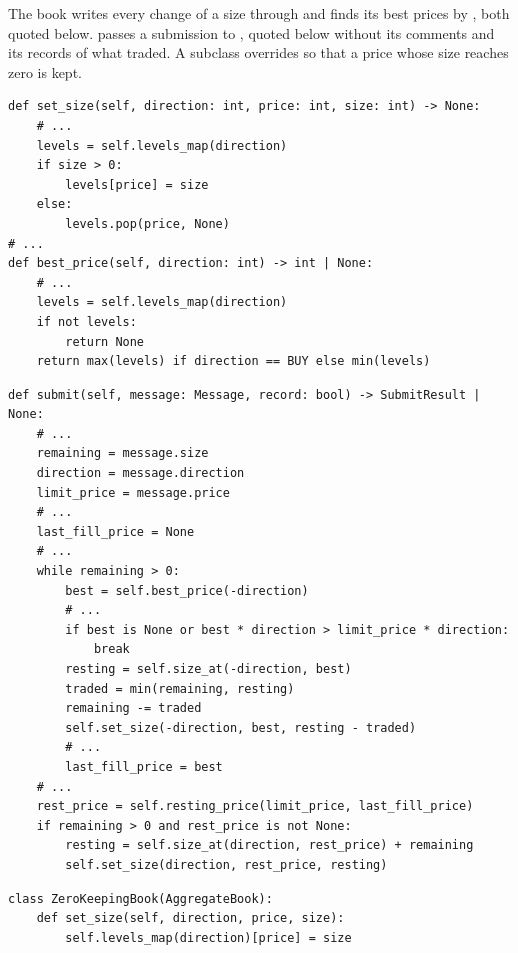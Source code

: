 \begin{question}
\label{question.setSizeKeepingEmptyLevelsNeverReturns}
The book writes every change of a size through 
and finds its best prices by , both quoted below.
 passes a submission to ,
quoted below without its comments and its records of what traded.
A subclass overrides  so that a price whose size reaches zero is kept.
\begin{lstlisting}[caption={\protect\codehl{unito26.lob.orderbook.AggregateBook}: a write, and the best price. Docstrings elided.}, label=listing.setSizeKeepingEmptyLevelsStorage]
def set_size(self, direction: int, price: int, size: int) -> None:
    # ...
    levels = self.levels_map(direction)
    if size > 0:
        levels[price] = size
    else:
        levels.pop(price, None)
# ...
def best_price(self, direction: int) -> int | None:
    # ...
    levels = self.levels_map(direction)
    if not levels:
        return None
    return max(levels) if direction == BUY else min(levels)
\end{lstlisting}
\begin{lstlisting}[caption={\protect\codehl{unito26.lob.orderbook.AggregateBook.submit}, abridged: its comments, and its records of what traded, are cut.}, label=listing.setSizeKeepingEmptyLevelsSubmit]
def submit(self, message: Message, record: bool) -> SubmitResult | None:
    # ...
    remaining = message.size
    direction = message.direction
    limit_price = message.price
    # ...
    last_fill_price = None
    # ...
    while remaining > 0:
        best = self.best_price(-direction)
        # ...
        if best is None or best * direction > limit_price * direction:
            break
        resting = self.size_at(-direction, best)
        traded = min(remaining, resting)
        remaining -= traded
        self.set_size(-direction, best, resting - traded)
        # ...
        last_fill_price = best
    # ...
    rest_price = self.resting_price(limit_price, last_fill_price)
    if remaining > 0 and rest_price is not None:
        resting = self.size_at(direction, rest_price) + remaining
        self.set_size(direction, rest_price, resting)
\end{lstlisting}
\begin{lstlisting}[caption={A subclass that keeps a level of size zero}, label=listing.setSizeKeepingEmptyLevelsClass]
class ZeroKeepingBook(AggregateBook):
    def set_size(self, direction, price, size):
        self.levels_map(direction)[price] = size

\end{lstlisting}
\end{question}
